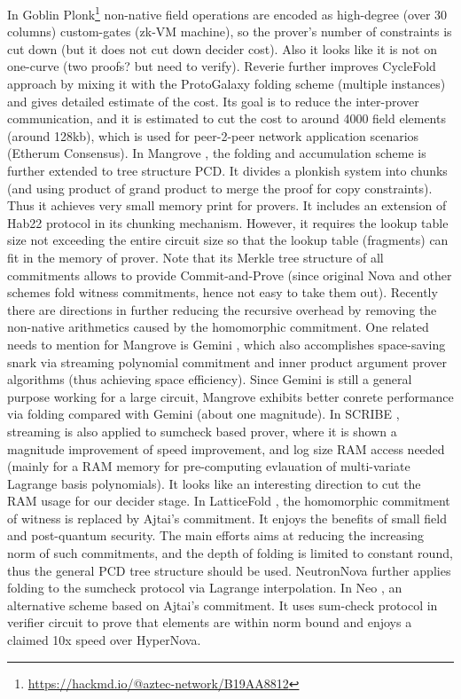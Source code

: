 In Goblin Plonk\footnote{\url{https://hackmd.io/@aztec-network/B19AA8812}}
non-native field operations are encoded as
high-degree (over 30 columns) custom-gates (zk-VM machine),
so the prover's number of constraints is cut down (but 
it does not cut down decider cost). Also it looks like
it is not on one-curve (two proofs? but need to verify).
Reverie \cite{Reverie} further improves CycleFold approach
by mixing it with the ProtoGalaxy folding scheme (multiple instances)
and gives detailed estimate of the cost. Its goal is to reduce
the inter-prover communication, and it is estimated to cut
the cost to around 4000 field elements (around 128kb), which
is used for peer-2-peer network application scenarios (Etherum Consensus).
In Mangrove \cite{Mangrove}, the folding and accumulation scheme
is further extended to tree structure PCD. It divides a plonkish
system into chunks (and using product of grand product to merge
the proof for copy constraints). Thus it achieves very small
memory print for provers. It includes an extension of
Hab22 protocol in its chunking mechanism. However, it requires
the lookup table size not exceeding the entire circuit size so that 
the lookup table (fragments) can fit in the memory of prover.
Note that its Merkle tree structure of all commitments allows to
provide Commit-and-Prove (since original Nova and other schemes
fold witness commitments, hence not easy to take them out).
Recently there are directions in further reducing the
recursive overhead by removing the non-native arithmetics caused
by the homomorphic commitment.
One related needs to mention for Mangrove is Gemini \cite{Gemini},
which also accomplishes space-saving snark via streaming
polynomial commitment and inner product argument prover algorithms
(thus achieving space efficiency). Since Gemini is still
a general purpose working for a large circuit, Mangrove exhibits
better conrete performance via folding compared with Gemini (about
one magnitude).
In SCRIBE \cite{scribe}, streaming is also applied
to sumcheck based prover, where it is shown a magnitude improvement
of speed improvement, and log size RAM access needed (mainly
for a RAM memory for pre-computing evlauation of multi-variate
Lagrange basis polynomials). It looks like
an interesting direction to cut the RAM usage for our decider stage.
In LatticeFold \cite{LatticeFold}, the homomorphic commitment
of witness is replaced by Ajtai's commitment. It 
enjoys the benefits of small field and post-quantum 
security.  The main efforts aims at reducing the increasing norm 
of such commitments, and the depth of folding is limited
to constant round, thus the general PCD tree structure should be used.
NeutronNova \cite{NeutronNova} further applies folding to
the sumcheck protocol via Lagrange interpolation.
In Neo \cite{Neo}, an alternative scheme based on Ajtai's commitment.
It uses sum-check protocol in verifier circuit to prove
that elements are within norm bound and enjoys a claimed
10x speed over HyperNova.

